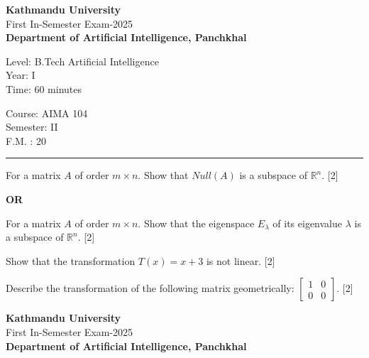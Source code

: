 \documentclass[12pt]{exam}
\begin{document}
\begin{center}
 {\bfseries  {\large Kathmandu University}} \\
 First In-Semester Exam-2025\\[-1mm]
 {\small \textbf{Department of Artificial Intelligence, Panchkhal}}
\end{center}

\begin{minipage}{0.70\linewidth}
  \begin{flushleft}
    Level: B.Tech Artificial Intelligence \\
    Year: I \\
    Time: 60 minutes
  \end{flushleft}
\end{minipage} \hfill
\begin{minipage}{0.25\linewidth}
  \begin{flushleft}
    Course: AIMA 104 \\
    Semester: II \\
    F.M. : 20
  \end{flushleft}
\end{minipage}
\vskip 2mm
\rule{\textwidth}{1pt}
\vskip 2mm
\begin{questions}
\question For a matrix $A$ of order $m \times n$. Show that $Null(A)$ is a subspace of $\mathbb{R}^n$. [2]
  \begin{center}
    \bfseries OR
  \end{center}
  For a matrix $A$ of order $m \times n$. Show that the eigenspace $E_{\lambda}$ of its eigenvalue $\lambda$ is a subspace of $\mathbb{R}^n$. [2]

  \question Show that the transformation $T(x)=x+3$ is not linear. [2]

  \question Describe the transformation of the following matrix geometrically:
  $\begin{bmatrix}
    1 & 0\\
    0 & 0
  \end{bmatrix}$. [2]
\end{questions}
\vspace{2cm}
\begin{center}
 {\bfseries  {\large Kathmandu University}} \\
 First In-Semester Exam-2025\\[-1mm]
 {\small \textbf{Department of Artificial Intelligence, Panchkhal}}
\end{center}
\end{document}
